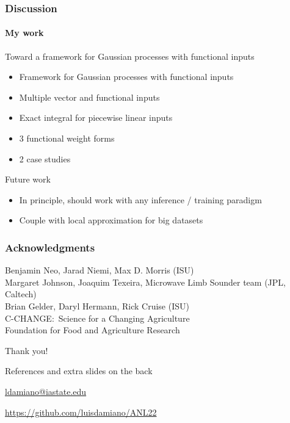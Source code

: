 \documentclass{snedecorbeamer}
\begin{document}
\begin{frame}
  \frametitle{Discussion}
  \framesubtitle{My work}

  Toward a framework for Gaussian processes with functional inputs
  \begin{itemize}
  \item Framework for Gaussian processes with functional inputs
  \item Multiple vector and functional inputs
  \item Exact integral for piecewise linear inputs
  \item 3 functional weight forms
  \item 2 case studies
  \end{itemize}

  Future work
  \begin{itemize}
  \item In principle, should work with any inference / training paradigm
  \item Couple with local approximation for big datasets
  \end{itemize}
\end{frame}


\begin{frame}[c]
  \frametitle{Acknowledgments}
  \centering

  {\small
    Benjamin Neo, Jarad Niemi, Max D. Morris (ISU) \\
    Margaret Johnson, Joaquim Texeira, Microwave Limb Sounder team
    (JPL, Caltech) \\
    Brian Gelder, Daryl Hermann, Rick Cruise (ISU) \\
    C-CHANGE:~Science for a Changing Agriculture \\
    Foundation for Food and Agriculture Research
  }

  \vfill

  {\huge Thank you!}

  \vfill

  {\tiny References and extra slides on the back}

  \href{ldamiano@iastate.edu}{
    ldamiano@iastate.edu}

  \href{https://github.com/luisdamiano/ANL22}{
https://github.com/luisdamiano/ANL22}
\end{frame}
\end{document}
